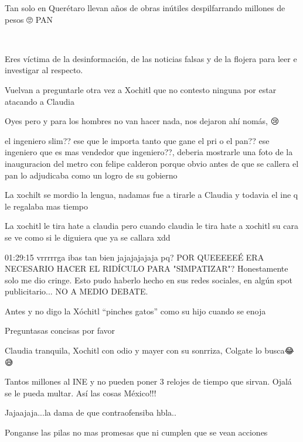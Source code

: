 Tan solo en Querétaro llevan años de obras inútiles despilfarrando millones de pesos 🙄 PAN

🎉

Eres víctima de la desinformación, de las noticias falsas y de la flojera para leer e investigar al respecto.

Vuelvan a preguntarle otra vez a Xochitl que  no contesto ninguna por estar atacando a Claudia

Oyes pero y para los hombres no van hacer nada, nos dejaron ahí nomás, 😢

el ingeniero slim?? ese que le importa tanto que gane el pri o el pan?? ese ingeniero que es mas vendedor que ingeniero??, deberia mostrarle una foto de la inauguracion del metro con felipe calderon porque obvio antes de que se callera el pan lo adjudicaba como un logro de su gobierno

La xochilt se mordio la lengua, nadamas fue a tirarle a Claudia  y todavia el ine q le regalaba mas tiempo 🤨😠

La xochitl le tira hate a claudia pero cuando claudia le tira hate a xochitl su cara se ve como si le diguiera que ya se callara xdd

01:29:15 vrrrrrga ibas tan bien jajajajajaja pq? POR QUEEEEEÉ ERA NECESARIO HACER EL RIDÍCULO PARA "SIMPATIZAR"?
Honestamente solo me dio cringe.
Esto pudo haberlo hecho en sus redes sociales, en algún spot publicitario...
NO A MEDIO DEBATE.

Antes y no digo la Xóchitl “pinches gatos” como su hijo cuando se enoja

Preguntasas concisas por favor

Claudia tranquila, Xochitl con odio y mayer con su sonrriza, Colgate lo busca😂😅

Tantos millones al INE y no pueden poner 3 relojes de tiempo que sirvan. Ojalá se le pueda multar. Así las cosas México!!!

Jajaajaja...la dama de que contraofensiba hbla..

Ponganse las pilas no mas promesas que ni cumplen que se vean acciones

